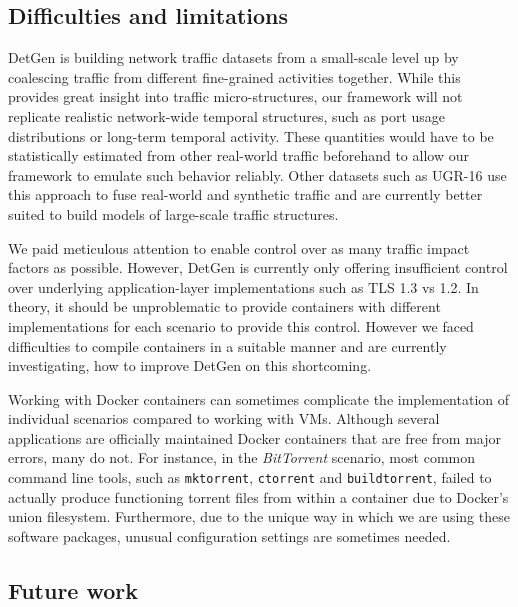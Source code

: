 \documentclass[sigconf]{acmart}
\begin{document}
\subsection{Difficulties and limitations}

DetGen is building network traffic datasets from a small-scale level up by coalescing traffic from different fine-grained activities together. While this provides great insight into traffic micro-structures, our framework will not replicate realistic network-wide temporal structures, such as port usage distributions or long-term temporal activity. These quantities would have to be statistically estimated from other real-world traffic beforehand to allow our framework to emulate such behavior reliably. Other datasets such as UGR-16 use this approach to fuse real-world and synthetic traffic and are currently better suited to build models of large-scale traffic structures.

We paid meticulous attention to enable control over as many traffic impact factors as possible. However, DetGen is currently only offering insufficient control over underlying application-layer implementations such as TLS 1.3 vs 1.2. In theory, it should be unproblematic to provide containers with different implementations for each scenario to provide this control. However we faced difficulties to compile containers in a suitable manner and are currently investigating, how to improve DetGen on this shortcoming.

Working with Docker containers can sometimes complicate the implementation of individual scenarios compared to working with VMs. Although several applications are officially maintained Docker containers that are free from major errors, many do not. For instance, in the \textit{BitTorrent} scenario, most common command line tools, such as \texttt{mktorrent}, \texttt{ctorrent} and \texttt{buildtorrent}, failed to actually produce functioning torrent files from within a container due to Docker's union filesystem. Furthermore, due to the unique way in which we are using these software packages, unusual configuration settings are sometimes needed. %



\subsection{Future work}
\end{document}
